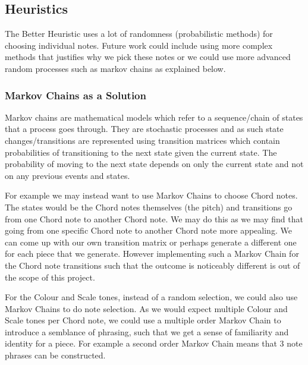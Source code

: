 \documentclass[pdftex,12pt,a4paper]{report}
\begin{document}
\subsection{Heuristics}
The Better Heuristic uses a lot of randomness (probabilistic methods) for choosing individual notes. Future work could include using more complex methods that justifies why we pick these notes or we could use more advanced random processes such as markov chains as explained below.

\subsubsection{Markov Chains as a Solution}
Markov chains are mathematical models which refer to a sequence/chain of states that a process goes through. They are stochastic processes and as such state changes/transitions are represented using transition matrices which contain probabilities of transitioning to the next state given the current state. The probability of moving to the next state depends on only the current state and not on any previous events and states.
 
For example we may instead want to use Markov Chains to choose Chord notes. The states would be the Chord notes themselves (the pitch) and transitions go from one Chord note to another Chord note. We may do this as we may find that going from one specific Chord note to another Chord note more appealing. We can come up with our own transition matrix or perhaps generate a different one for each piece that we generate. However implementing such a Markov Chain for the Chord note transitions such that the outcome is noticeably different is out of the scope of this project.

For the Colour and Scale tones, instead of a random selection, we could also use Markov Chains to do note selection. As we would expect multiple Colour and Scale tones per Chord note, we could use a multiple order Markov Chain to introduce a semblance of phrasing, such that we get a sense of familiarity and identity for a piece. For example a second order Markov Chain means that 3 note phrases can be constructed. 




\end{document}
